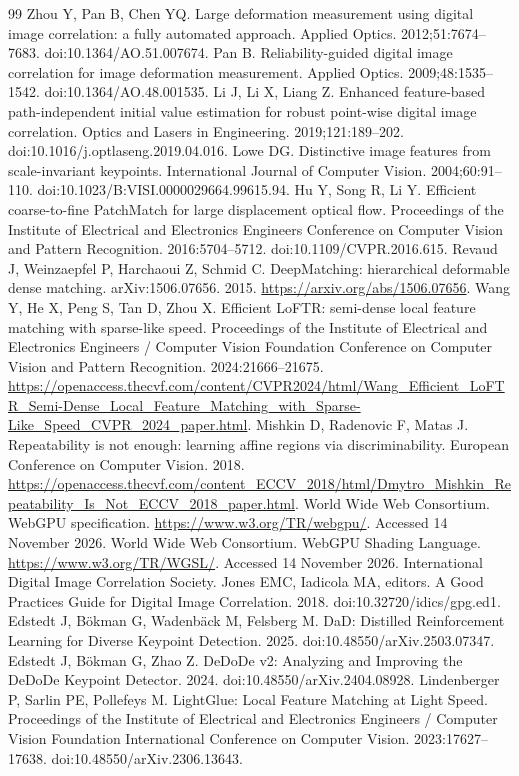 \begin{thebibliography}{99}
 Zhou Y, Pan B, Chen YQ. Large deformation measurement using digital image correlation: a fully automated approach. Applied Optics. 2012;51:7674--7683. doi:10.1364/AO.51.007674.
 Pan B. Reliability-guided digital image correlation for image deformation measurement. Applied Optics. 2009;48:1535--1542. doi:10.1364/AO.48.001535.
 Li J, Li X, Liang Z. Enhanced feature-based path-independent initial value estimation for robust point-wise digital image correlation. Optics and Lasers in Engineering. 2019;121:189--202. doi:10.1016/j.optlaseng.2019.04.016.
 Lowe DG. Distinctive image features from scale-invariant keypoints. International Journal of Computer Vision. 2004;60:91--110. doi:10.1023/B:VISI.0000029664.99615.94.
 Hu Y, Song R, Li Y. Efficient coarse-to-fine PatchMatch for large displacement optical flow. Proceedings of the Institute of Electrical and Electronics Engineers Conference on Computer Vision and Pattern Recognition. 2016:5704--5712. doi:10.1109/CVPR.2016.615.
 Revaud J, Weinzaepfel P, Harchaoui Z, Schmid C. DeepMatching: hierarchical deformable dense matching. arXiv:1506.07656. 2015. \url{https://arxiv.org/abs/1506.07656}.
 Wang Y, He X, Peng S, Tan D, Zhou X. Efficient LoFTR: semi-dense local feature matching with sparse-like speed. Proceedings of the Institute of Electrical and Electronics Engineers / Computer Vision Foundation Conference on Computer Vision and Pattern Recognition. 2024:21666--21675. \url{https://openaccess.thecvf.com/content/CVPR2024/html/Wang_Efficient_LoFTR_Semi-Dense_Local_Feature_Matching_with_Sparse-Like_Speed_CVPR_2024_paper.html}.
 Mishkin D, Radenovic F, Matas J. Repeatability is not enough: learning affine regions via discriminability. European Conference on Computer Vision. 2018. \url{https://openaccess.thecvf.com/content_ECCV_2018/html/Dmytro_Mishkin_Repeatability_Is_Not_ECCV_2018_paper.html}.
 World Wide Web Consortium. WebGPU specification. \url{https://www.w3.org/TR/webgpu/}. Accessed 14 November 2026.
 World Wide Web Consortium. WebGPU Shading Language. \url{https://www.w3.org/TR/WGSL/}. Accessed 14 November 2026.
 International Digital Image Correlation Society. Jones EMC, Iadicola MA, editors. A Good Practices Guide for Digital Image Correlation. 2018. doi:10.32720/idics/gpg.ed1.
 Edstedt J, B\"okman G, Wadenb\"ack M, Felsberg M. DaD: Distilled Reinforcement Learning for Diverse Keypoint Detection. 2025. doi:10.48550/arXiv.2503.07347.
 Edstedt J, B\"okman G, Zhao Z. DeDoDe v2: Analyzing and Improving the DeDoDe Keypoint Detector. 2024. doi:10.48550/arXiv.2404.08928.
 Lindenberger P, Sarlin PE, Pollefeys M. LightGlue: Local Feature Matching at Light Speed. Proceedings of the Institute of Electrical and Electronics Engineers / Computer Vision Foundation International Conference on Computer Vision. 2023:17627--17638. doi:10.48550/arXiv.2306.13643.
\end{thebibliography}
